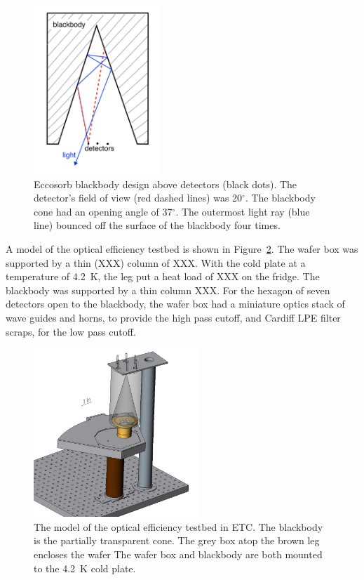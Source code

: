 \begin{figure}[htp]
\begin{center}
\includegraphics[height=2.5in]{figures/blackbody_design.jpeg}
\caption{Eccosorb blackbody design above detectors (black dots). The detector's field of view (red dashed lines) was 20$^{\circ}$. The blackbody cone had an opening angle of 37$^{\circ}$. The outermost light ray (blue line) bounced off the surface of the blackbody four times. 
\label{fig:blackbody_design} }
\end{center}
\end{figure}

A model of the optical efficiency testbed is shown in Figure~\ref{fig:opt_eff_setup}. 
The wafer box was supported by a thin (XXX) column of XXX. 
With the cold plate at a temperature of 4.2~K, the leg put a heat load of XXX on the fridge. 
The blackbody was supported by a thin column XXX. 
For the hexagon of seven detectors open to the blackbody, the wafer box had a miniature optics stack of wave guides and horns, to provide the high pass cutoff, and Cardiff LPE filter scraps, for the low pass cutoff. 


\begin{figure}[htp]
\begin{center}
\includegraphics[height=2.5in]{figures/optical_efficiency_setup.jpg}
\caption{The model of the optical efficiency testbed in \ac{ETC}. 
The blackbody is the partially transparent cone. 
The grey box atop the brown leg encloses the wafer 
The wafer box and blackbody are both mounted to the 4.2~K cold plate. 
\label{fig:opt_eff_setup} }
\end{center}
\end{figure}

